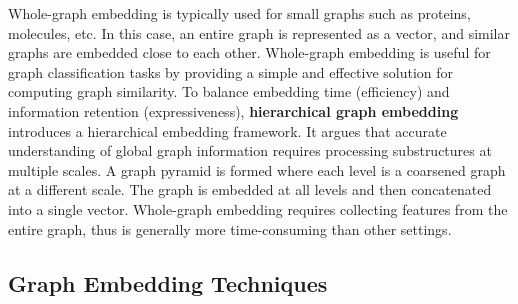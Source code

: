 Whole-graph embedding is typically used for small graphs such as proteins, molecules, etc. In this case, an entire graph is represented as a vector, and similar graphs are embedded close to each other. Whole-graph embedding is useful for graph classification tasks by providing a simple and effective solution for computing graph similarity. To balance embedding time (efficiency) and information retention (expressiveness), \textbf{hierarchical graph embedding} \cite{mousavi2017hierarchical} introduces a hierarchical embedding framework. It argues that accurate understanding of global graph information requires processing substructures at multiple scales. A graph pyramid is formed where each level is a coarsened graph at a different scale. The graph is embedded at all levels and then concatenated into a single vector. Whole-graph embedding requires collecting features from the entire graph, thus is generally more time-consuming than other settings.


\subsection{Graph Embedding Techniques}

